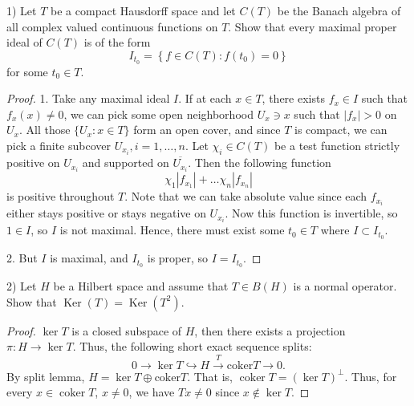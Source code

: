 
\begin{problem}
	1) Let $T$ be a compact Hausdorff space and let $C(T)$ be the Banach algebra of all complex valued continuous functions on $T$. Show that every maximal proper ideal of $C(T)$ is of the form
\[
I_{t_0}=\left\{f \in C(T): f\left(t_0\right)=0\right\}
\]
for some $t_0 \in T$.
\end{problem}
\begin{proof}
	1. Take any maximal ideal $I$. If at each $x \in T$, there exists $f_x \in I$ such that $f_x(x) \neq 0$, we can pick some open neighborhood $U_x \ni x$ such that $|f_x| >0$ on $U_x$. All those $\{U_x: x \in T\} $ form an open cover, and since $T$ is compact, we can pick a finite subcover $U_{x_i}, i = 1, \ldots, n$. Let $\chi_i \in C(T)$ be a test function strictly positive on $U_{x_i}$ and supported on $\overline{U_{x_i}} $. Then the following function
	\[
		\chi_1 |f_{x_1}| + \ldots  \chi_n |f_{x_n}|
	\] 
	is positive throughout $T$. Note that we can take absolute value since each $f_{x_i}$ either stays positive or stays negative on $U_{x_i}$. Now this function is invertible, so $1 \in I$, so $I$ is not maximal. Hence, there must exist some $t_0 \in T$ where $I \subset I_{t_0}$.

	2. But $I$ is maximal, and $I_{t_0}$ is proper, so $I = I_{t_0}$.
\end{proof}

\begin{problem}
2) Let $H$ be a Hilbert space and assume that $T \in B(H)$ is a normal operator. Show that $\operatorname{Ker}(T)=\operatorname{Ker}\left(T^2\right)$.	
\end{problem}
\begin{proof}
	$\operatorname{ker} T$ is a closed subspace of $H$, then there exists a projection $\pi: H \to \operatorname{ker} T$. Thus, the following short exact sequence splits:
	\[
		0 \to \operatorname{ker} T \hookrightarrow H \xrightarrow{T} \text{coker} T \to 0
	.\] 
	By split lemma, $H = \operatorname{ker} T \oplus \text{coker}T$. That is, $\operatorname{coker} T = (\operatorname{ker} T)^\perp$. Thus, for every $x \in \operatorname{coker} T$, $x \neq 0$, we have $T x \neq 0$ since $x \not\in \operatorname{ker} T$.
\end{proof}

